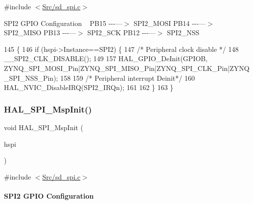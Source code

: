 {\ttfamily \#include $<$\mbox{\hyperlink{sd__spi_8c}{Src/sd\+\_\+spi.\+c}}$>$}

S\+P\+I2 G\+P\+IO Configuration ~\newline
P\+B15 -\/-\/-\/---$>$ S\+P\+I2\+\_\+\+M\+O\+SI P\+B14 -\/-\/-\/---$>$ S\+P\+I2\+\_\+\+M\+I\+SO P\+B13 -\/-\/-\/---$>$ S\+P\+I2\+\_\+\+S\+CK P\+B12 -\/-\/-\/---$>$ S\+P\+I2\+\_\+\+N\+SS
\begin{DoxyCode}
145 \{
146     \textcolor{keywordflow}{if} (hspi->Instance==SPI2) \{
147         \textcolor{comment}{/* Peripheral clock disable */}
148         \_\_SPI2\_CLK\_DISABLE();
149   
157         HAL\_GPIO\_DeInit(GPIOB, ZYNQ\_SPI\_MOSI\_Pin|ZYNQ\_SPI\_MISO\_Pin|ZYNQ\_SPI\_CLK\_Pin|ZYNQ\_SPI\_NSS\_Pin);
158 
159         \textcolor{comment}{/* Peripheral interrupt Deinit*/}
160         HAL\_NVIC\_DisableIRQ(SPI2\_IRQn);
161 
162     \}
163 \} 
\end{DoxyCode}
\mbox{\label{group___s_d___s_p_i___functions_ga17f583be14b22caffa6c4e56dcd035ef}} 
\subsubsection{\texorpdfstring{H\+A\+L\+\_\+\+S\+P\+I\+\_\+\+Msp\+Init()}{HAL\_SPI\_MspInit()}}
{\footnotesize\ttfamily void H\+A\+L\+\_\+\+S\+P\+I\+\_\+\+Msp\+Init (\begin{DoxyParamCaption}\item[{S\+P\+I\+\_\+\+Handle\+Type\+Def $\ast$}]{hspi }\end{DoxyParamCaption})}



{\ttfamily \#include $<$\mbox{\hyperlink{sd__spi_8c}{Src/sd\+\_\+spi.\+c}}$>$}

\paragraph*{S\+P\+I2 G\+P\+IO Configuration}

